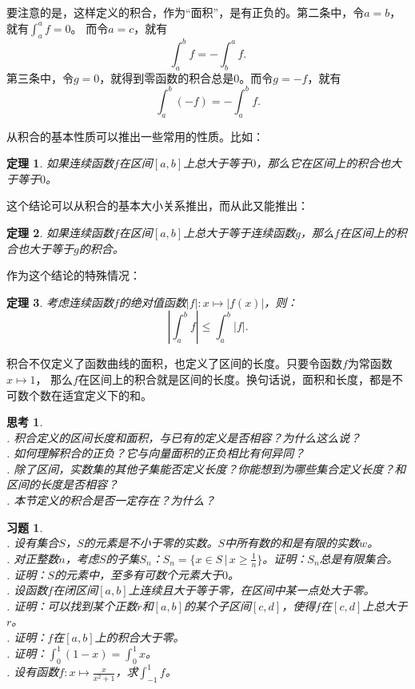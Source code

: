 \documentclass[12pt,UTF8]{ctexbook}
\newtheorem{tm}{定理}[section]
\newtheorem{sk}{思考}[section]
\newtheorem{xt}{习题}[section]
\begin{document}
要注意的是，这样定义的积合，作为“面积”，是有正负的。第二条中，令$a=b$，就有$\int_a^a f = 0$。
而令$a = c$，就有
$$\int_a^b f = - \int_b^a f.$$
第三条中，令$g=0$，就得到零函数的积合总是$0$。而令$g = -f$，就有
$$\int_a^b (-f) = -\int_a^b f. $$

从积合的基本性质可以推出一些常用的性质。比如：

\begin{tm}
    如果连续函数$f$在区间$[a,b]$上总大于等于$0$，那么它在区间上的积合也大于等于$0$。
\end{tm}

这个结论可以从积合的基本大小关系推出，而从此又能推出：

\begin{tm}
    如果连续函数$f$在区间$[a,b]$上总大于等于连续函数$g$，那么$f$在区间上的积合也大于等于$g$的积合。
\end{tm}

作为这个结论的特殊情况：

\begin{tm}
    考虑连续函数$f$的绝对值函数$|f|: x\mapsto |f(x)|$，则：
    $$ \left| \int_a^b f \right| \leqslant \int_a^b |f|. $$

\end{tm}

积合不仅定义了函数曲线的面积，也定义了区间的长度。只要令函数$f$为常函数$x\mapsto 1$，
那么$f$在区间上的积合就是区间的长度。换句话说，面积和长度，都是不可数个数在适宜定义下的和。

\begin{sk}
    \mbox{} \\
    . 积合定义的区间长度和面积，与已有的定义是否相容？为什么这么说？\\
    . 如何理解积合的正负？它与向量面积的正负相比有何异同？\\
    . 除了区间，实数集的其他子集能否定义长度？你能想到为哪些集合定义长度？和区间的长度是否相容？\\
    . 本节定义的积合是否一定存在？为什么？
\end{sk}

\begin{xt}
    \mbox{} \\
    . 设有集合$S$，$S$的元素是不小于零的实数。$S$中所有数的和是有限的实数$w$。\\
    . 对正整数$n$，考虑$S$的子集$S_n$：$S_n = \{x\in S \, | \, x \geqslant \frac{1}{n}\}$。证明：$S_n$总是有限集合。\\
    . 证明：$S$的元素中，至多有可数个元素大于$0$。\\
    . 设函数$f$在闭区间$[a, b]$上连续且大于等于零，在区间中某一点处大于零。\\
    . 证明：可以找到某个正数$r$和$[a, b]$的某个子区间$[c,d]$，使得$f$在$[c,d]$上总大于$r$。\\
    . 证明：$f$在$[a, b]$上的积合大于零。\\
    . 证明：$\int_0^1 (1 - x) = \int_0^1 x$。\\
    . 设有函数$f: x\mapsto \frac{x}{x^2+1}$，求$\int_{-1}^1 f$。\\
\end{xt}
\end{document}
